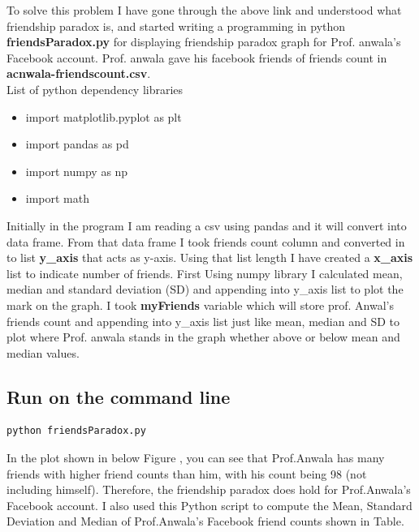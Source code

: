 \documentclass[letterpaper,11pt]{article}
\begin{document}
To solve this problem I have gone through the above link and understood what friendship paradox is, and started writing a programming in python \textbf{friendsParadox.py}  for displaying friendship paradox graph for Prof. anwala’s Facebook account. Prof. anwala gave his facebook friends of friends count in \textbf{acnwala-friendscount.csv}.\\
List of python dependency libraries
\begin{itemize}
    \item import matplotlib.pyplot as plt
    \item import pandas as pd
    \item import numpy as np
    \item import math
\end{itemize}
Initially in the program I am reading a csv using pandas and it will convert into data frame. From that data frame I took friends count column and converted in to list \textbf{y\_axis} that acts as y-axis. Using that list length I have created a \textbf{x\_axis} list to indicate number of friends. First Using numpy library I calculated mean, median and standard deviation (SD) and appending into y\_axis list to plot the mark on the graph. I took \textbf{myFriends} variable which will store prof. Anwal’s friends count and appending into y\_axis list just like mean, median and SD to plot where Prof. anwala stands in the graph whether above or below mean and median values. 
\subsection*{Run on the command line}
\begin{lstlisting}[frame=single]
python friendsParadox.py
\end{lstlisting}


 In the plot shown in below  Figure , you can see that Prof.Anwala has many friends with higher friend counts than him, with his count being 98 (not including himself). Therefore, the friendship paradox does hold for Prof.Anwala's Facebook account. I also used this Python script to compute the Mean, Standard Deviation and Median of Prof.Anwala's Facebook friend counts shown in Table.
\end{document}
